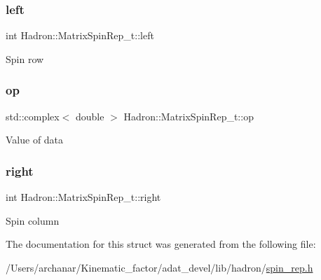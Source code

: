 \subsubsection{\texorpdfstring{left}{left}}
{\footnotesize\ttfamily int Hadron\+::\+Matrix\+Spin\+Rep\+\_\+t\+::left}

Spin row \mbox{\label{structHadron_1_1MatrixSpinRep__t_aebc25f04c53c0422ab31366020649dad}} 
\subsubsection{\texorpdfstring{op}{op}}
{\footnotesize\ttfamily std\+::complex$<$ double $>$ Hadron\+::\+Matrix\+Spin\+Rep\+\_\+t\+::op}

Value of data \mbox{\label{structHadron_1_1MatrixSpinRep__t_a8c99524ce50d315e915216514946d5ec}} 
\subsubsection{\texorpdfstring{right}{right}}
{\footnotesize\ttfamily int Hadron\+::\+Matrix\+Spin\+Rep\+\_\+t\+::right}

Spin column 

The documentation for this struct was generated from the following file\+:\begin{DoxyCompactItemize}
\item 
/\+Users/archanar/\+Kinematic\+\_\+factor/adat\+\_\+devel/lib/hadron/\mbox{\hyperlink{lib_2hadron_2spin__rep_8h}{spin\+\_\+rep.\+h}}\end{DoxyCompactItemize}
